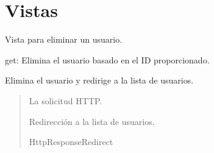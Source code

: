\documentclass[letterpaper,10pt,spanish]{sphinxmanual}
\begin{document}
\section{Vistas}
\label{\detokenize{usuarios:vistas}}

\begin{fulllineitems}

\pysigstartsignatures
{}
\pysigstopsignatures
\sphinxAtStartPar
Vista para eliminar un usuario.
\begin{description}
\sphinxAtStartPar
get: Elimina el usuario basado en el ID proporcionado.

\end{description}


\begin{fulllineitems}

\pysigstartsignatures
{}
\pysigstopsignatures
\sphinxAtStartPar
Elimina el usuario y redirige a la lista de usuarios.
\begin{quote}\begin{description}
\sphinxAtStartPar
{} \textendash{} La solicitud HTTP.

\sphinxAtStartPar
Redirección a la lista de usuarios.

\sphinxAtStartPar
HttpResponseRedirect

\end{description}\end{quote}

\end{fulllineitems}


\end{fulllineitems}
\end{document}
